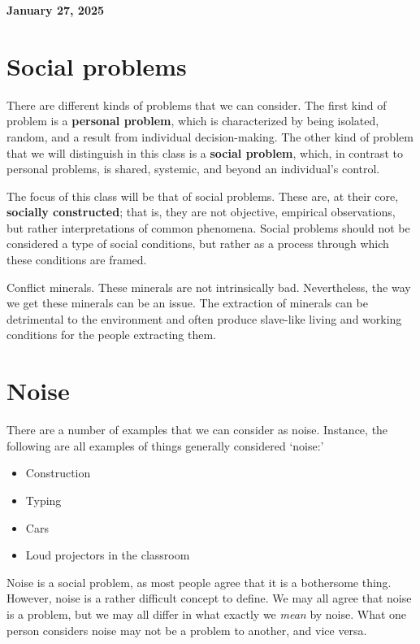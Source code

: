 
\textbf{January 27\th, 2025}

\section{Social problems}

There are different kinds of problems that we can consider.
The first kind of problem is a \textbf{personal problem}, which is characterized by being isolated, random, and a result from individual decision-making.
The other kind of problem that we will distinguish in this class is a \textbf{social problem}, which, in contrast to personal problems, is shared, systemic, and beyond an individual's control.

The focus of this class will be that of social problems.
These are, at their core, \textbf{socially constructed}; 
that is, they are not objective, empirical observations, but rather interpretations of common phenomena.
Social problems should not be considered a type of social conditions, but rather as a process through which these conditions are framed.

Conflict minerals.
These minerals are not intrinsically bad.
Nevertheless, the way we get these minerals can be an issue.
The extraction of minerals can be detrimental to the environment and often produce slave-like living and working conditions for the people extracting them.


\section{Noise}
There are a number of examples that we can consider as noise.
Instance, the following are all examples of things generally considered `noise:'
\begin{itemize}
    \item Construction
    \item Typing
    \item Cars
    \item Loud projectors in the classroom
\end{itemize}

Noise is a social problem, as most people agree that it is a bothersome thing.
However, noise is a rather difficult concept to define.
We may all agree that noise is a problem, but we may all differ in what exactly we \textit{mean} by noise.
What one person considers noise may not be a problem to another, and vice versa.

